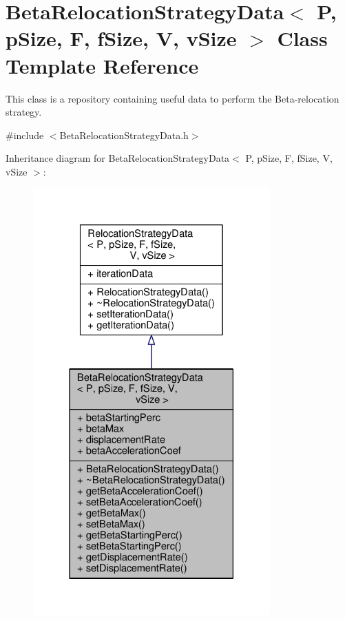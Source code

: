 \hypertarget{structBetaRelocationStrategyData}{}\section{Beta\+Relocation\+Strategy\+Data$<$ P, p\+Size, F, f\+Size, V, v\+Size $>$ Class Template Reference}
\label{structBetaRelocationStrategyData}


This class is a repository containing useful data to perform the Beta-\/relocation strategy.  




{\ttfamily \#include $<$Beta\+Relocation\+Strategy\+Data.\+h$>$}



Inheritance diagram for Beta\+Relocation\+Strategy\+Data$<$ P, p\+Size, F, f\+Size, V, v\+Size $>$\+:
\nopagebreak
\begin{figure}[H]
\begin{center}
\leavevmode
\includegraphics[width=258pt]{structBetaRelocationStrategyData__inherit__graph}
\end{center}
\end{figure}


